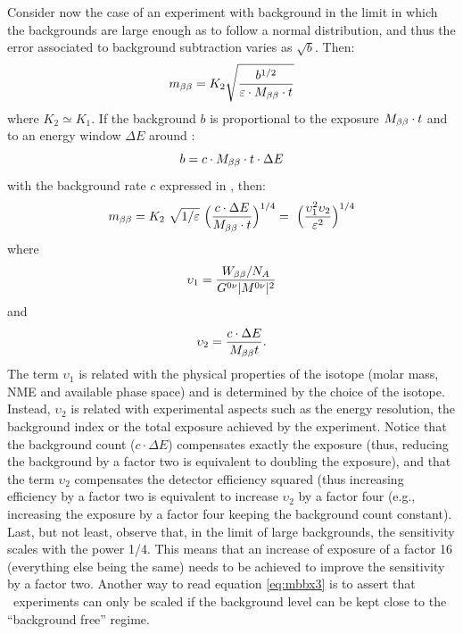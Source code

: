 Consider now the case of an experiment with background in the limit in which the backgrounds are large enough as to follow a normal distribution, and thus the error associated to background subtraction varies as $\sqrt{b}$. Then:
%
\begin{equation}
m_{\beta\beta} =K_{2} \sqrt{\frac{b^{1/2}}{\varepsilon\cdot M_{\beta\beta} \cdot t}} 
\label{eq:mbbx1}
\end{equation}
%
where $K_{2}\simeq K_1$. If the background $b$ is proportional to the exposure $M_{\beta\beta} \cdot t$ and to an energy window $\Delta E$ around \Qbb :
\begin{equation}
b = c\cdot M_{\beta\beta} \cdot t\cdot \Delta E
\label{eq:mbbx2}
\end{equation}
%
with the background rate $c$ expressed in \ckkbby, then:
%
\begin{equation}
m_{\beta\beta} = K_2  \ \sqrt{1/\varepsilon} \ \Big(\frac{c\cdot \Delta E}{M_{\beta\beta} \cdot t}\Big)^{1/4} 
=\ \Big(\frac{\upsilon_1^2 \upsilon_2}{\varepsilon^2}\Big)^{1/4}
\label{eq:mbbx3}
\end{equation}
%
where 
$$\upsilon_1 = \frac{W_{\beta\beta}/N_A}{G^{0\nu}\lvert M^{0\nu}\rvert^2}$$ 
and 
$$\upsilon_2 = \frac{c\cdot \Delta E}{M_{\beta\beta} t}.$$ 
%
%
The term $\upsilon_1$ is related with the physical properties of the isotope (molar mass, NME and available phase space) and is determined by the choice of the isotope. Instead, $\upsilon_2$ is related with experimental aspects such as the energy resolution, the background index or the total exposure achieved by the experiment. Notice that the background count
($c\cdot \Delta E$) compensates exactly the exposure (thus, reducing the background by a factor two is equivalent to doubling the exposure), and that the term $\upsilon_2$
compensates the detector efficiency squared (thus increasing efficiency by a factor two is equivalent to increase $\upsilon_2$ by a factor four (e.g., increasing the exposure by a factor four keeping the background count constant). Last, but not least, observe that, in the limit of large backgrounds, the sensitivity scales with the power 1/4. This means that an increase of exposure of a factor 16 (everything else being the same) needs to be achieved to improve the sensitivity by a factor two. Another way to read equation \ref{eq:mbbx3} is to assert that \bbonu\ experiments can only be scaled if the background level can be kept close to the ``background free'' regime. 

